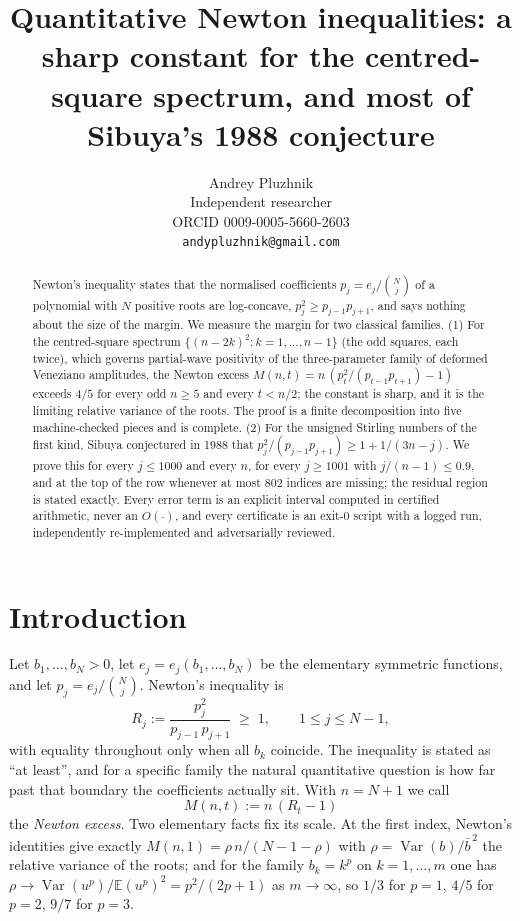 \documentclass[12pt]{article}
\title{Quantitative Newton inequalities: a sharp constant for the centred-square spectrum, and most of Sibuya's 1988 conjecture}
\author{Andrey Pluzhnik\\
\small Independent researcher\\
\small ORCID 0009-0005-5660-2603\\
\small \texttt{andypluzhnik@gmail.com}}
\DeclareMathOperator{\Var}{Var}
\begin{document}
\maketitle

\begin{abstract}
Newton's inequality states that the normalised coefficients $p_j = e_j/\binom{N}{j}$ of a polynomial with $N$ positive roots are log-concave, $p_j^2 \ge p_{j-1}p_{j+1}$, and says nothing about the size of the margin. We measure the margin for two classical families. (1) For the centred-square spectrum $\{(n-2k)^2 : k=1,\dots,n-1\}$ (the odd squares, each twice), which governs partial-wave positivity of the three-parameter family of deformed Veneziano amplitudes, the Newton excess $M(n,t) = n\,(p_t^2/(p_{t-1}p_{t+1})-1)$ exceeds $4/5$ for every odd $n\ge5$ and every $t<n/2$; the constant is sharp, and it is the limiting relative variance of the roots. The proof is a finite decomposition into five machine-checked pieces and is complete. (2) For the unsigned Stirling numbers of the first kind, Sibuya conjectured in 1988 that $p_j^2/(p_{j-1}p_{j+1}) \ge 1 + 1/(3n-j)$. We prove this for every $j\le 1000$ and every $n$, for every $j\ge 1001$ with $j/(n-1)\le 0.9$, and at the top of the row whenever at most $802$ indices are missing; the residual region is stated exactly. Every error term is an explicit interval computed in certified arithmetic, never an $O(\cdot)$, and every certificate is an exit-$0$ script with a logged run, independently re-implemented and adversarially reviewed.

\end{abstract}

\section{Introduction}

Let $b_1,\dots,b_N>0$, let $e_j = e_j(b_1,\dots,b_N)$ be the elementary symmetric functions, and let $p_j = e_j/\binom{N}{j}$. Newton's inequality \cite{Newton1707} is
\begin{equation}\label{eq:newton}
R_j := \frac{p_j^2}{p_{j-1}\,p_{j+1}} \;\ge\; 1, \qquad 1\le j\le N-1,
\end{equation}
with equality throughout only when all $b_k$ coincide. The inequality is stated as ``at least'', and for a specific family the natural quantitative question is how far past that boundary the coefficients actually sit. With $n = N+1$ we call
\begin{equation}\label{eq:excess}
M(n,t) := n\,(R_t - 1)
\end{equation}
the \emph{Newton excess}. Two elementary facts fix its scale. At the first index, Newton's identities give exactly $M(n,1) = \rho\,n/(N-1-\rho)$ with $\rho = \Var(b)/\bar b^{\,2}$ the relative variance of the roots; and for the family $b_k = k^p$ on $k=1,\dots,m$ one has $\rho \to \Var(u^p)/\mathbb{E}(u^p)^2 = p^2/(2p+1)$ as $m\to\infty$, so $1/3$ for $p=1$, $4/5$ for $p=2$, $9/7$ for $p=3$.
\end{document}
